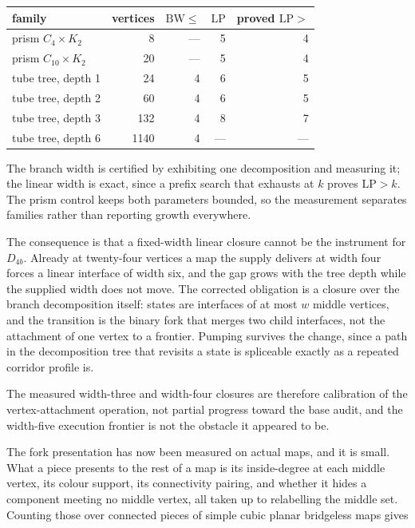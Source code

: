 \begin{center}
\small
\begin{tabular}{@{}lrrrr@{}}
\toprule
family & vertices & $\mathrm{BW}\le$ & $\mathrm{LP}$ & proved $\mathrm{LP}>$\\
\midrule
prism $C_4\times K_2$ & 8 & --- & 5 & 4\\
prism $C_{10}\times K_2$ & 20 & --- & 5 & 4\\
tube tree, depth 1 & 24 & 4 & 6 & 5\\
tube tree, depth 2 & 60 & 4 & 6 & 5\\
tube tree, depth 3 & 132 & 4 & 8 & 7\\
tube tree, depth 6 & 1140 & 4 & --- & ---\\
\bottomrule
\end{tabular}
\end{center}

The branch width is certified by exhibiting one decomposition and measuring
it; the linear width is exact, since a prefix search that exhausts at $k$
proves $\mathrm{LP}>k$.  The prism control keeps both parameters bounded, so
the measurement separates families rather than reporting growth everywhere.

The consequence is that a fixed-width linear closure cannot be the instrument
for $D_{4b}$.  Already at twenty-four vertices a map the supply delivers at
width four forces a linear interface of width six, and the gap grows with the
tree depth while the supplied width does not move.  The corrected obligation
is a closure over the branch decomposition itself: states are interfaces of at
most $w$ middle vertices, and the transition is the binary fork that merges
two child interfaces, not the attachment of one vertex to a frontier.  Pumping
survives the change, since a path in the decomposition tree that revisits a
state is spliceable exactly as a repeated corridor profile is.

The measured width-three and width-four closures are therefore calibration of
the vertex-attachment operation, not partial progress toward the base audit,
and the width-five execution frontier is not the obstacle it appeared to be.

The fork presentation has now been measured on actual maps, and it is small.
What a piece presents to the rest of a map is its inside-degree at each middle
vertex, its colour support, its connectivity pairing, and whether it hides a
component meeting no middle vertex, all taken up to relabelling the middle
set.  Counting those over connected pieces of simple cubic planar bridgeless
maps gives

